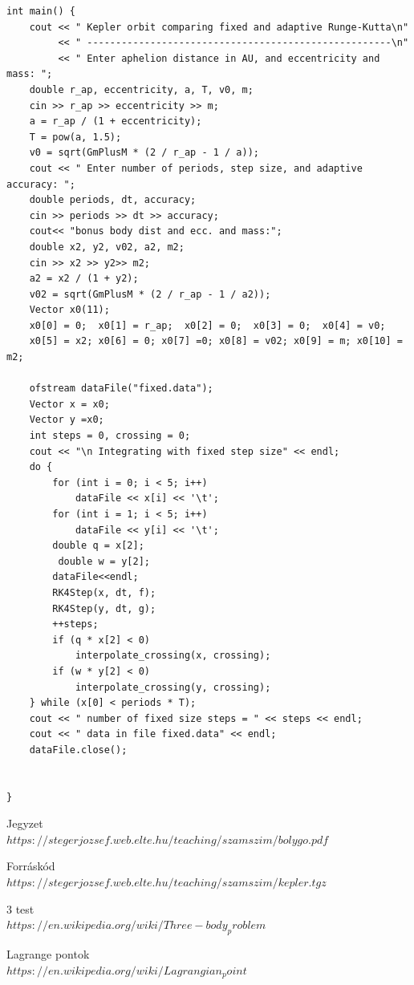 \documentclass[paper=a4, fontsize=11pt]{article}
\begin{document}
\begin{verbatim}
int main() {
    cout << " Kepler orbit comparing fixed and adaptive Runge-Kutta\n"
         << " -----------------------------------------------------\n"
         << " Enter aphelion distance in AU, and eccentricity and mass: ";
    double r_ap, eccentricity, a, T, v0, m;
    cin >> r_ap >> eccentricity >> m;
    a = r_ap / (1 + eccentricity);
    T = pow(a, 1.5);
    v0 = sqrt(GmPlusM * (2 / r_ap - 1 / a));
    cout << " Enter number of periods, step size, and adaptive accuracy: ";
    double periods, dt, accuracy;
    cin >> periods >> dt >> accuracy;
    cout<< "bonus body dist and ecc. and mass:";
    double x2, y2, v02, a2, m2;
    cin >> x2 >> y2>> m2;
    a2 = x2 / (1 + y2);
    v02 = sqrt(GmPlusM * (2 / r_ap - 1 / a2));
    Vector x0(11);
    x0[0] = 0;  x0[1] = r_ap;  x0[2] = 0;  x0[3] = 0;  x0[4] = v0; 
    x0[5] = x2; x0[6] = 0; x0[7] =0; x0[8] = v02; x0[9] = m; x0[10] = m2;

    ofstream dataFile("fixed.data");
    Vector x = x0;
    Vector y =x0;
    int steps = 0, crossing = 0;
    cout << "\n Integrating with fixed step size" << endl;
    do {
        for (int i = 0; i < 5; i++)
            dataFile << x[i] << '\t';
        for (int i = 1; i < 5; i++)
            dataFile << y[i] << '\t';
        double q = x[2];
         double w = y[2];
        dataFile<<endl;
        RK4Step(x, dt, f);
        RK4Step(y, dt, g);
        ++steps;
        if (q * x[2] < 0)
            interpolate_crossing(x, crossing);
        if (w * y[2] < 0)
            interpolate_crossing(y, crossing);
    } while (x[0] < periods * T);
    cout << " number of fixed size steps = " << steps << endl;
    cout << " data in file fixed.data" << endl;
    dataFile.close();


}
\end{verbatim}






\newpage


\begin{thebibliography}{2}

 
Jegyzet
\\\texttt{$https://stegerjozsef.web.elte.hu/teaching/szamszim/bolygo.pdf$}
 
Forráskód
\\\texttt{$https://stegerjozsef.web.elte.hu/teaching/szamszim/kepler.tgz$}

3 test
\\\texttt{$https://en.wikipedia.org/wiki/Three-body_problem$}

Lagrange pontok
\\\texttt{$https://en.wikipedia.org/wiki/Lagrangian_point$}

\end{thebibliography}
\end{document}

